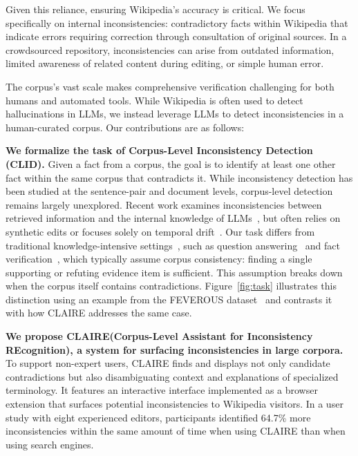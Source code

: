 \documentclass[11pt]{article}
\newcommand{\task}[0]{CLID\xspace}
\newcommand{\system}[0]{\textsc{CLAIRE}\xspace}
\newcommand{\feverous}[0]{\textsc{FEVEROUS}\xspace}
\begin{document}
Given this reliance, ensuring Wikipedia's accuracy is critical. We focus specifically on internal inconsistencies: contradictory facts within Wikipedia that indicate errors requiring correction through consultation of original sources. In a crowdsourced repository, inconsistencies can arise from outdated information, limited awareness of related content during editing, or simple human error.

The corpus's vast scale makes comprehensive verification challenging for both humans and automated tools.
While Wikipedia is often used to detect hallucinations in LLMs, we instead leverage LLMs to detect inconsistencies in a human-curated corpus.
Our contributions are as follows:

\textbf{We formalize the task of Corpus-Level Inconsistency Detection (\task).} Given a fact from a corpus, the goal is to identify at least one other fact within the same corpus that contradicts it. While inconsistency detection has been studied at the sentence-pair and document levels, corpus-level detection remains largely unexplored. Recent work examines inconsistencies between retrieved information and the internal knowledge of LLMs~\citep{su2024textttconflictbank, jin2024tugofwar, xie2023adaptive, wang2025retrievalaugmented}, but often relies on synthetic edits or focuses solely on temporal drift~\citep{marjanovic-etal-2024-dynamicqa}. Our task differs from traditional knowledge-intensive settings~\citep{petroni-etal-2021-kilt}, such as question answering~\citep{kwiatkowski-etal-2019-natural, joshi-etal-2017-triviaqa} and fact verification~\citep{thorne-etal-2018-fever, jiang-etal-2020-hover}, which typically assume corpus consistency: finding a single supporting or refuting evidence item is sufficient. This assumption breaks down when the corpus itself contains contradictions. Figure~\ref{fig:task} illustrates this distinction using an example from the \feverous dataset~\cite{aly-etal-2021-fact} and contrasts it with how \system addresses the same case.

\textbf{We propose \system (Corpus-Level Assistant for Inconsistency REcognition), a system for surfacing inconsistencies in large corpora.} To support non-expert users, \system finds and displays not only candidate contradictions but also disambiguating context and explanations of specialized terminology. It features an interactive interface implemented as a browser extension that surfaces potential inconsistencies to Wikipedia visitors. In a user study with eight experienced editors, participants identified 64.7\% more inconsistencies within the same amount of time when using \system than when using search engines.
\end{document}
